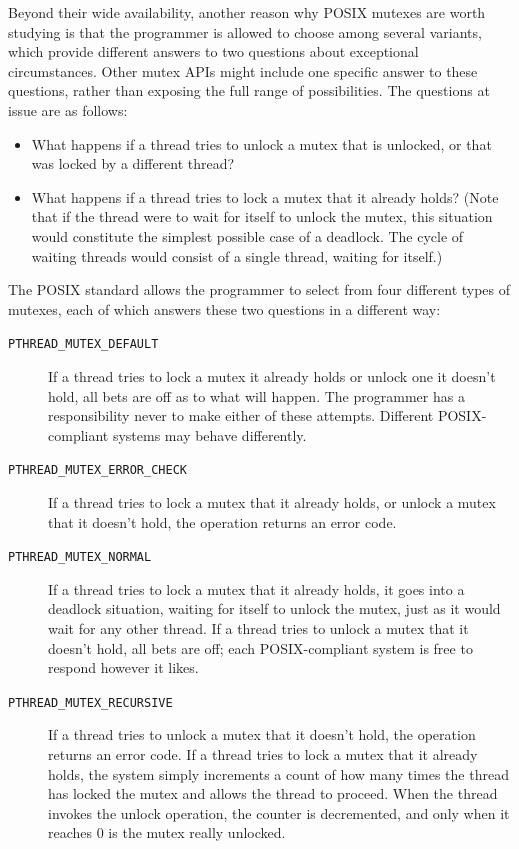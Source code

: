Beyond their wide availability, another reason why POSIX mutexes are
worth studying is that the programmer is allowed to choose among several
variants, which provide different answers to two questions about exceptional
circumstances.
Other mutex APIs might include one specific answer to these questions,
rather than exposing the full range of possibilities.  The questions
at issue are as follows:
\begin{itemize}
\item
What happens if a thread tries to unlock a mutex that is unlocked, or that was locked by a
different thread?
\item
What happens if a thread tries to lock a mutex that it already holds?
(Note that if the thread were to wait for itself to unlock the mutex,
this situation would constitute the simplest possible case of a deadlock.  The cycle of
waiting threads would consist of a single thread, waiting for itself.)
\end{itemize}

The POSIX standard allows the programmer to select from four different
types of mutexes, each of which answers these two questions in a
different way:
\begin{description}
\item[\texttt{PTHREAD\_MUTEX\_DEFAULT}]
If a thread tries to
lock a mutex it already holds or unlock one it doesn't hold, all bets are off as to what will happen.
The programmer has a responsibility never to make either of these attempts.
Different POSIX-compliant systems may behave differently.
\item[\texttt{PTHREAD\_MUTEX\_ERROR\_CHECK}]
If a thread tries to lock a mutex that it already holds, or unlock a
mutex that it doesn't hold, the operation returns an error code.
\item[\texttt{PTHREAD\_MUTEX\_NORMAL}]
If a thread tries to lock a mutex that it already holds, it goes into
a deadlock situation, waiting for itself to unlock the mutex, just
as it would wait for any other thread.  If a thread tries to unlock
a mutex that it doesn't hold, all bets are off; each POSIX-compliant
system is free to respond however it likes.
\item[\texttt{PTHREAD\_MUTEX\_RECURSIVE}]
If a thread tries to unlock a mutex that it doesn't hold, the
operation returns an error code.  If a thread tries to lock a mutex
that it already holds, the system simply increments a count of how
many times the thread has locked the mutex and allows the thread to
proceed.  When the thread invokes the unlock operation, the counter is
decremented, and only when it reaches 0 is the mutex really unlocked.
\end{description}

